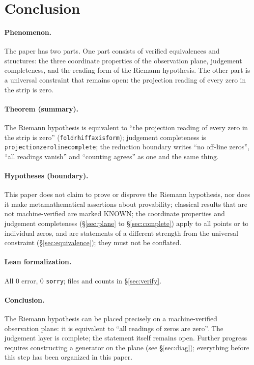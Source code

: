 \documentclass{article}
\renewcommand{\_}{\underscoreOrig\allowbreak}
\begin{document}
\section{Conclusion}
\label{sec:conclusion}

\paragraph{Phenomenon.} The paper has two parts. One part consists of
verified equivalences and structures: the three coordinate properties of
the observation plane, judgement completeness, and the reading form of
the Riemann hypothesis. The other part is a universal constraint that
remains open: the projection reading of every zero in the strip is zero.

\paragraph{Theorem (summary).} The Riemann hypothesis is equivalent to
``the projection reading of every zero in the strip is zero''
(\texttt{fold\_rh\_iff\_axis\_form}); judgement completeness is
\texttt{projection\_zero\_line\_complete}; the reduction boundary writes
``no off-line zeros'', ``all readings vanish'' and ``counting agrees''
as one and the same thing.

\paragraph{Hypotheses (boundary).} This paper does not claim to prove or
disprove the Riemann hypothesis, nor does it make metamathematical
assertions about provability; classical results that are not
machine-verified are marked KNOWN; the coordinate properties and
judgement completeness (\S\ref{sec:plane} to \S\ref{sec:complete}) apply
to all points or to individual zeros, and are statements of a different
strength from the universal constraint (\S\ref{sec:equivalence}); they
must not be conflated.

\paragraph{Lean formalization.} All 0 error, 0 \texttt{sorry}; files and
counts in \S\ref{sec:verify}.

\paragraph{Conclusion.} The Riemann hypothesis can be placed precisely
on a machine-verified observation plane: it is equivalent to ``all
readings of zeros are zero''. The judgement layer is complete; the
statement itself remains open. Further progress requires constructing a
generator on the plane (see \S\ref{sec:diag}); everything before this
step has been organized in this paper.
\end{document}
